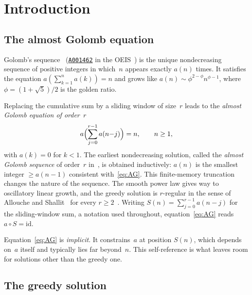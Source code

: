\documentclass{birkjour}
\theoremstyle{definition}
\theoremstyle{remark}
\begin{document}
\maketitle

\section{Introduction}\label{sec:intro}

\subsection{The almost Golomb equation}

Golomb's sequence~\cite{Golomb}
(\href{https://oeis.org/A001462}{\texttt{A001462}} in the
OEIS~\cite{OEIS}) is the unique
nondecreasing sequence of positive integers in which~$n$
appears exactly $a(n)$ times. It satisfies the equation
$a(\sum_{k=1}^{n}a(k))=n$ and grows like
$a(n)\sim\phi^{2-\phi}n^{\phi-1}$,
where $\phi=(1+\sqrt{5})/2$ is the golden ratio.

Replacing the cumulative sum by a sliding
window of size~$r$ leads to the
\emph{almost Golomb equation of order~$r$}
\begin{equation}\label{eq:AG}
  a\Bigl(\sum_{j=0}^{r-1}a(n{-}j)\Bigr)=n,
  \qquad n\ge 1,
\end{equation}
with $a(k)=0$ for $k<1$.
The earliest nondecreasing solution, called the
\emph{almost Golomb sequence} of order~$r$
in~\cite{Cloitre_AG}, is obtained inductively:
$a(n)$ is the smallest integer $\ge a(n{-}1)$
consistent with~\eqref{eq:AG}.
This finite-memory truncation changes the nature
of the sequence. The smooth power law
gives way to oscillatory linear growth, and the
greedy solution is $r$-regular in the sense of
Allouche and Shallit~\cite{AS} for every
$r\ge 2$~\cite{Cloitre_AG}.
Writing $S(n)=\sum_{j=0}^{r-1}a(n{-}j)$ for the
sliding-window sum, a notation used throughout,
equation~\eqref{eq:AG} reads $a\circ S=\mathrm{id}$.

Equation~\eqref{eq:AG} is \emph{implicit}. It
constrains~$a$ at position $S(n)$, which depends
on~$a$ itself and typically lies far beyond~$n$.
This self-reference is what leaves room for
solutions other than the greedy one.

\subsection{The greedy solution}
\end{document}
